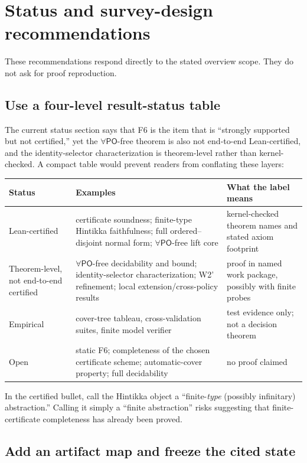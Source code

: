 \documentclass[11pt]{article}
\newcommand{\PO}{\ensuremath{\mathsf{PO}}}
\begin{document}
\section{Status and survey-design recommendations}

These recommendations respond directly to the stated overview scope. They do not ask for proof reproduction.

\subsection{Use a four-level result-status table}

The current status section says that F6 is the item that is ``strongly supported but not certified,'' yet the \(\forall\PO\)-free theorem is also not end-to-end Lean-certified, and the identity-selector characterization is theorem-level rather than kernel-checked. A compact table would prevent readers from conflating these layers:

\begin{center}
\begin{tabularx}{\textwidth}{@{}lY Y@{}}
\toprule
\textbf{Status} & \textbf{Examples} & \textbf{What the label means} \\
\midrule
Lean-certified & certificate soundness; finite-type Hintikka faithfulness; full ordered--disjoint normal form; \(\forall\PO\)-free lift core & kernel-checked theorem names and stated axiom footprint \\
Theorem-level, not end-to-end certified & \(\forall\PO\)-free decidability and bound; identity-selector characterization; W2' refinement; local extension/cross-policy results & proof in named work package, possibly with finite probes \\
Empirical & cover-tree tableau, cross-validation suites, finite model verifier & test evidence only; not a decision theorem \\
Open & static F6; completeness of the chosen certificate scheme; automatic-cover property; full decidability & no proof claimed \\
\bottomrule
\end{tabularx}
\end{center}

In the certified bullet, call the Hintikka object a ``finite-\emph{type} (possibly infinitary) abstraction.'' Calling it simply a ``finite abstraction'' risks suggesting that finite-certificate completeness has already been proved.

\subsection{Add an artifact map and freeze the cited state}
\end{document}
